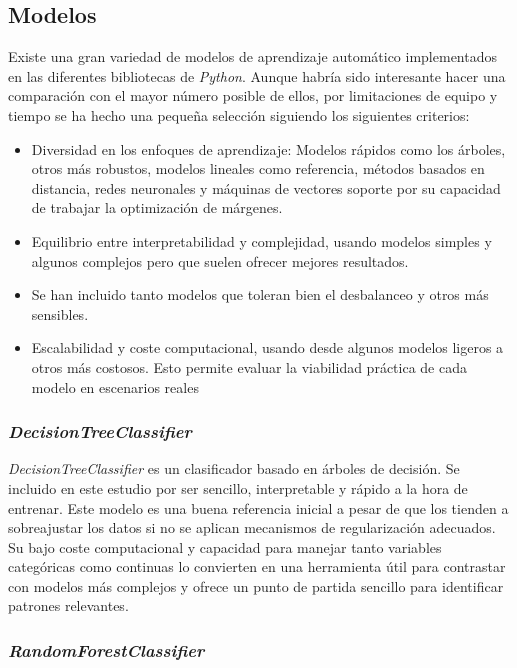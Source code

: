 \subsection{Modelos}
\label{subsec:select_model}

Existe una gran variedad de modelos de aprendizaje automático implementados en las diferentes bibliotecas de \textit{Python}. Aunque habría sido interesante hacer una comparación con el mayor número posible de ellos, por limitaciones de equipo y tiempo se ha hecho una pequeña selección siguiendo los siguientes criterios:

\begin{itemize}
	\item Diversidad en los enfoques de aprendizaje: Modelos rápidos como los árboles, otros más robustos, modelos lineales como referencia, métodos basados en distancia, redes neuronales y máquinas de vectores soporte por su capacidad de trabajar la optimización de márgenes.
	\item Equilibrio entre interpretabilidad y complejidad, usando modelos simples y algunos complejos pero que suelen ofrecer mejores resultados.
	\item Se han incluido tanto modelos que toleran bien el desbalanceo y otros más sensibles.
	\item Escalabilidad y coste computacional, usando desde algunos modelos ligeros a otros más costosos. Esto permite evaluar la viabilidad práctica de cada modelo en escenarios reales
\end{itemize}

\subsubsection{\textit{DecisionTreeClassifier}}
\label{subsubsec:decisiontreeclassifier}

\textit{DecisionTreeClassifier} es un clasificador basado en árboles de decisión. Se incluido en este estudio por ser sencillo, interpretable y rápido a la hora de entrenar. Este modelo es una buena referencia inicial a pesar de que los tienden a sobreajustar los datos si no se aplican mecanismos de regularización adecuados. Su bajo coste computacional y capacidad para manejar tanto variables categóricas como continuas lo convierten en una herramienta útil para contrastar con modelos más complejos y ofrece un punto de partida sencillo para identificar patrones relevantes.

\subsubsection{\textit{RandomForestClassifier}}
\label{subsubsec:randomforestclassifier}

